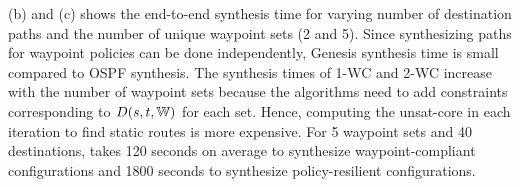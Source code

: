 \begin{figure}
	\centering
\end{figure}

(b) and (c) shows the end-to-end synthesis
 time for varying number of destination paths and the 
 number of unique waypoint sets (2 and 5). 
 Since synthesizing paths
 for waypoint policies can be done independently,
Genesis synthesis time is small compared to OSPF synthesis. 
The synthesis times of 1-WC and 2-WC 
increase with the number of waypoint sets because
the algorithms 
need to add constraints corresponding to $D(s,t,\mathbb{W})$ 
for each set. Hence, computing the unsat-core in each
iteration to find static routes is more expensive. 
For 5 waypoint sets and 40 destinations, \name takes 120 
seconds on average to synthesize waypoint-compliant configurations
and 1800 seconds to synthesize policy-resilient configurations.

